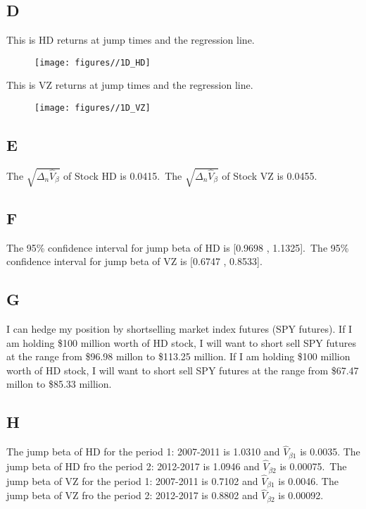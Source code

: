 \documentclass{report}
\begin{document}
\subsection{D}

This is HD returns at jump times and the regression line.
\begin{figure}[H]
        \centering 
         \texttt{[image: figures//1D\_HD]}
\end{figure}

This is VZ returns at jump times and the regression line.
\begin{figure}[H]
        \centering 
         \texttt{[image: figures//1D\_VZ]}
\end{figure}

\subsection{E}

The $ \sqrt{\Delta_{n}\hat{V}_{\beta}} $ of Stock HD is 0.0415.\
The $ \sqrt{\Delta_{n}\hat{V}_{\beta}} $ of Stock VZ is 0.0455.

\subsection{F}

The 95\% confidence interval for jump beta of HD is [0.9698 , 1.1325].\
The 95\% confidence interval for jump beta of VZ is [0.6747 , 0.8533].

\subsection{G}

I can hedge my position by shortselling market index futures (SPY futures). If I am holding \$100 million worth of HD stock, I will want to short sell SPY futures at the range from \$96.98 millon to \$113.25 million. If I am holding \$100 million worth of HD stock, I will want to short sell SPY futures at the range from \$67.47 millon to \$85.33 million. 

\subsection{H}

The jump beta of HD for the period 1: 2007-2011 is 1.0310 and $ \hat{V}_{\beta 1} $ is 0.0035. The jump beta of HD fro the period 2: 2012-2017 is 1.0946 and $ \hat{V}_{\beta 2}$ is 0.00075.\
The jump beta of VZ for the period 1: 2007-2011 is 0.7102 and $ \hat{V}_{\beta 1} $ is 0.0046. The jump beta of VZ fro the period 2: 2012-2017 is 0.8802 and $ \hat{V}_{\beta 2}$ is 0.00092.
\end{document}
